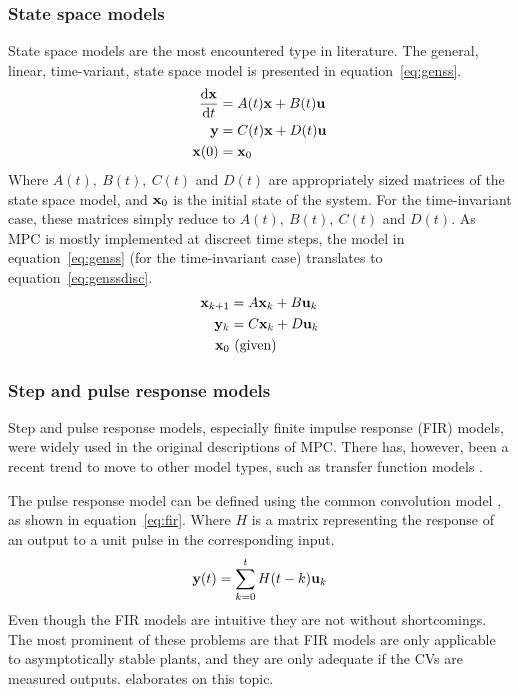 \subsubsection{State space models}
State space models are the most encountered type in literature.
The general, linear, time-variant, state space model is presented in equation~\ref{eq:genss}.
\begin{align}
  \label{eq:genss}
  \frac{\mathrm{d}{\bf {x}}}{\mathrm{d}t} &= A(t){\bf {x}} + B(t){\bf {u}} \notag \\
  {\bf {y}} &= C(t){\bf {x}} + D(t){\bf {u}} \\
  {\bf {x}}(0) &= {\bf {x}}_0 \notag
\end{align}
Where $A(t),~B(t),~C(t)$ and $D(t)$ are appropriately sized matrices of the state space model, and ${\bf {x}}_0$ is the initial state of the system.
For the time-invariant case, these matrices simply reduce to $A(t),~B(t),~C(t)$ and $D(t)$. 
As MPC is mostly implemented at discreet time steps, the model in equation~\ref{eq:genss} (for the time-invariant case) translates to equation~\ref{eq:genssdisc}.
\begin{align}
  \label{eq:genssdisc}
  {\bf {x}}_{k+1} &= A{\bf {x}}_k + B{\bf {u}}_k \notag \\
  {\bf {y}}_k &= C{\bf {x}}_k + D{\bf {u}}_k \\
  {\bf {x}}_0 &~ \text{(given)} \notag
\end{align}

\subsubsection{Step and pulse response models}
Step and pulse response models, especially finite impulse response (FIR) models, were widely used in the original descriptions of MPC.
There has, however, been a recent trend to move to other model types, such as transfer function models .

The pulse response model can be defined using the common convolution model \citep[284]{luyben}, as shown in equation~\ref{eq:fir}.
Where $H$ is a matrix representing the response of an output to a unit pulse in the corresponding input.
\begin{equation}
  \label{eq:fir}
  {\bf {y}}(t) = \sum^t_{k=0}H(t-k){\bf {u}}_k
\end{equation} 
Even though the FIR models are intuitive they are not without shortcomings.
The most prominent of these problems are that FIR models are only applicable to asymptotically stable plants, and they are only adequate if the CVs are measured outputs.
\citet[109]{maciejowskimpc} elaborates on this topic.

